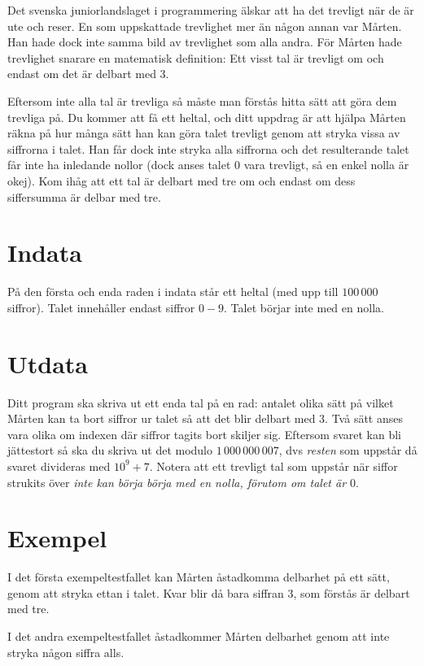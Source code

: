 Det svenska juniorlandslaget i programmering älskar att ha det trevligt när de
är ute och reser. En som uppskattade trevlighet mer än någon annan var Mårten.
Han hade dock inte samma bild av trevlighet som alla andra. För Mårten hade
trevlighet snarare en matematisk definition: Ett visst tal är trevligt om och
endast om det är delbart med 3.

Eftersom inte alla tal är trevliga så måste man förstås hitta sätt att göra dem
trevliga på. Du kommer att få ett heltal, och ditt uppdrag är att hjälpa Mårten
räkna på hur många sätt han kan göra talet trevligt genom att stryka vissa av
siffrorna i talet. Han får dock inte stryka alla siffrorna och det resulterande
talet får inte ha inledande nollor (dock anses talet $0$ vara trevligt, så en
enkel nolla är okej). Kom ihåg att ett tal är delbart med tre om
och endast om dess siffersumma är delbar med tre.

\section*{Indata}
På den första och enda raden i indata står ett heltal (med upp till $100\,000$
siffror). Talet innehåller endast siffror $0-9$. Talet börjar inte med en nolla.

\section*{Utdata}
Ditt program ska skriva ut ett enda tal på en rad: antalet olika sätt på vilket
Mårten kan ta bort siffror ur talet så att det blir delbart med 3. Två sätt
anses vara olika om indexen där siffror tagits bort skiljer sig. Eftersom
svaret kan bli jättestort så ska du skriva ut det modulo $1\,000\,000\,007$,
dvs \emph{resten} som uppstår då svaret divideras med $10^9 + 7$. Notera att
ett trevligt tal som uppstår när siffor strukits över \emph{inte kan börja
börja med en nolla, förutom om talet är $0$}.

\section*{Exempel}
I det första exempeltestfallet kan Mårten åstadkomma delbarhet på ett sätt,
genom att stryka ettan i talet. Kvar blir då bara siffran 3, som förstås är
delbart med tre.

I det andra exempeltestfallet åstadkommer Mårten delbarhet genom att inte
stryka någon siffra alls.

